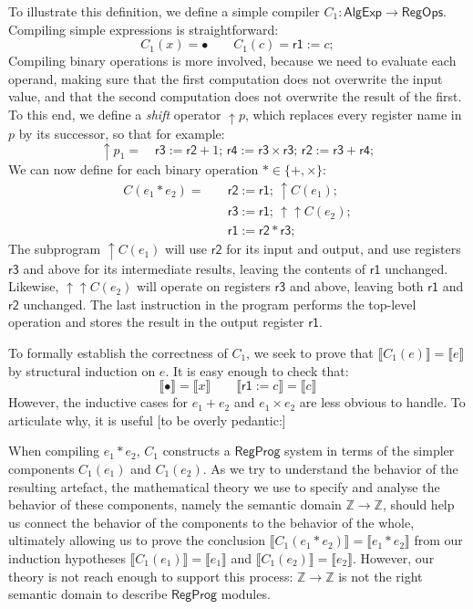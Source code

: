 \documentclass[sigplan,10pt,review,anonymous]{acmart}
\newcommand{\kw}[1]{\ensuremath{ \textsf{#1} }}
\begin{document}
\begin{example}[\kw{AlgExp} to \kw{RegOps}] %
To illustrate this definition,
we define a simple compiler $C_1 : \kw{AlgExp} \rightarrow \kw{RegOps}$.
Compiling simple expressions is straightforward:
\[
  C_1(x) = \bullet \qquad
  C_1(c) = \kw{r1} := c;
\]
Compiling binary operations is more involved,
because we need to evaluate each operand,
making sure that the first computation does not overwrite
the input value,
and that the second computation does not overwrite
the result of the first.
To this end,
we define a \emph{shift} operator ${\uparrow} p$,
which replaces every register name in $p$ by its successor,
so that for example:
\[
  {\uparrow} p_1 = \quad
  \kw{r3} := \kw{r2} + 1; \,
  \kw{r4} := \kw{r3} \times \kw{r3}; \,
  \kw{r2} := \kw{r3} + \kw{r4};
\]
We can now define for each binary operation $* \in \{+, \times\}$:
\begin{align*}
  C(e_1 * e_2) = \quad  %
    &\kw{r2} := \kw{r1}; \, %
    {\uparrow} C(e_1); \\
    &\kw{r3} := \kw{r1}; \,
    {\uparrow\uparrow} C(e_2); \\
    &\kw{r1} := \kw{r2} * \kw{r3};
\end{align*}
The subprogram ${\uparrow} C(e_1)$
will use $\kw{r2}$ for its input and output,
and use registers $\kw{r3}$ and above for its intermediate results,
leaving the contents of $\kw{r1}$ unchanged.
Likewise,
${\uparrow\uparrow} C(e_2)$
will operate on registers $\kw{r3}$ and above,
leaving both $\kw{r1}$ and $\kw{r2}$ unchanged.
The last instruction in the program performs
the top-level operation and stores the result
in the output register $\kw{r1}$.
\end{example}

To formally establish the correctness of $C_1$,
we seek to prove that
$\llbracket C_1(e) \rrbracket = \llbracket e \rrbracket$
by structural induction on $e$.
It is easy enough to check that:
\[
  \llbracket \bullet \rrbracket = \llbracket x \rrbracket \qquad
  \llbracket \kw{r1} := c \rrbracket = \llbracket c \rrbracket
\]
However,
the inductive cases for $e_1 + e_2$ and $e_1 \times e_2$
are less obvious to handle.
To articulate why,
it is useful [to be overly pedantic:]

When compiling $e_1 * e_2$,
$C_1$ constructs a $\kw{RegProg}$ system
in terms of the simpler components $C_1(e_1)$ and $C_1(e_2)$.
As we try to understand the behavior of the resulting artefact,
the mathematical theory we use to specify and analyse
the behavior of these components,
namely the semantic domain $\mathbb{Z} \rightarrow \mathbb{Z}$,
should help us connect
the behavior of the components to
the behavior of the whole,
ultimately allowing us to prove
the conclusion $\llbracket C_1(e_1 * e_2) \rrbracket = \llbracket e_1 * e_2 \rrbracket$
from our induction hypotheses
$\llbracket C_1(e_1) \rrbracket = \llbracket e_1 \rrbracket$ and
$\llbracket C_1(e_2) \rrbracket = \llbracket e_2 \rrbracket$.
However,
our theory is not reach enough to support this process:
$\mathbb{Z} \rightarrow \mathbb{Z}$
is not the right semantic domain
to describe $\kw{RegProg}$ modules.
\end{document}
